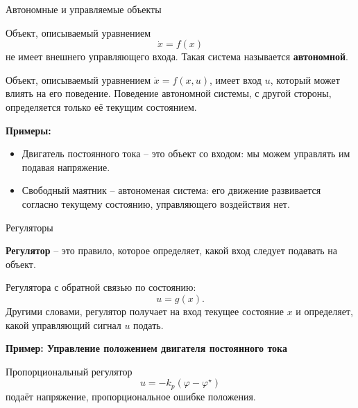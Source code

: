 \documentclass{beamer}
\begin{document}
	\begin{frame}{Автономные и управляемые объекты}
		\begin{flushleft}
			
			Объект, описываемый уравнением
			\[
			\dot{x}=f(x)
			\]
			не имеет внешнего управляющего входа. Такая система называется \textbf{автономной}.
			
			\bigskip
			
			Объект, описываемый уравнением \(\dot{x}=f(x,u)\), имеет вход \(u\), который может влиять
			на его поведение. Поведение автономной системы, с другой стороны, определяется только её текущим состоянием.
			
			\bigskip
			
			{
				
				\textbf{Примеры:}
				
				\begin{itemize}
					\item  Двигатель постоянного тока -- это объект со входом: мы можем управлять им подавая напряжение.
					\item Свободный маятник -- автономеная система: его движение развивается согласно текущему состоянию, управляющего воздействия нет.
				\end{itemize}
			}
			
		\end{flushleft}
	\end{frame}
	
	\begin{frame}{Регуляторы}
		\begin{flushleft}
			
			\textbf{Регулятор} -- это правило, которое определяет, какой вход следует подавать на объект.
			
			Регулятора с обратной связью по состоянию:
			\[
			u=g(x).
			\]
			Другими словами, регулятор получает на вход текущее состояние \(x\) и определяет,
			какой управляющий сигнал \(u\) подать.
			
			\bigskip
			
			{\mycolor{mydarkblue}
				\textbf{Пример: Управление положением двигателя постоянного тока}
				
				Пропорциональный регулятор
				\[
				u=-k_p(\varphi-\varphi^\star)
				\]
				подаёт напряжение, пропорциональное ошибке положения.
			}
		\end{flushleft}
	\end{frame}
	
\end{document}
